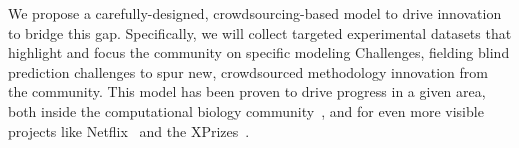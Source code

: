 \documentclass[11pt]{article}
\begin{document}
We propose a carefully-designed, crowdsourcing-based model to drive innovation to bridge this gap. 
Specifically, we will collect targeted experimental datasets that highlight and focus the community on specific modeling Challenges, fielding blind prediction challenges to spur new, crowdsourced methodology innovation from the community.
This model has been proven to drive progress in a given area, both inside the computational biology community~\cite{Moult:2014:Proteins, Monastyrskyy:2016:Proteins, Moult:2016:Proteins, Prill:2011:Sci.Signal., Eisenstein:2013:NatBiotech, Saez-Rodriguez:2016:NatRevGenet}, and for even more visible projects like Netflix~\cite{Bell:2010:CHANCE} and the XPrizes~\cite{::XPRIZE, Kay:2011:R&DManage, XPrize:2017:Wikipedia}. 
\end{document}
